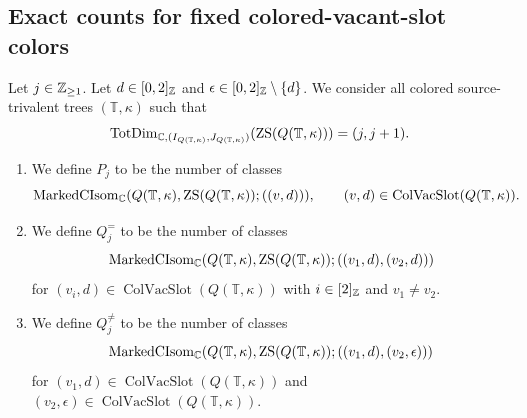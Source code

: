 \subsection{Exact counts for fixed colored-vacant-slot colors}
\begin{definition}\label{def:marked-block-counts}
Let $j\in\mathbb Z_{\ge1}$. Let $d\in[0,2]_{\mathbb Z}$ and $\epsilon\in[0,2]_{\mathbb Z}\setminus\{d\}$.
We consider all colored source-trivalent trees $(\mathbb T,\kappa)$ such that
\[
 \operatorname{TotDim}_{\mathbb C,(I_{Q(\mathbb T,\kappa)},J_{Q(\mathbb T,\kappa)})}(\operatorname{ZS}(Q(\mathbb T,\kappa)))=(j,j+1).
\]
\begin{enumerate}[font=\itshape]
\item We define $P_j$ to be the number of classes
\[
 \operatorname{MarkedCIsom}_{\mathbb C}(Q(\mathbb T,\kappa),\operatorname{ZS}(Q(\mathbb T,\kappa));((v,d))),
 \qquad (v,d)\in\operatorname{ColVacSlot}(Q(\mathbb T,\kappa)).
\]
\item We define $Q_j^{=}$ to be the number of classes
\[
 \operatorname{MarkedCIsom}_{\mathbb C}(Q(\mathbb T,\kappa),\operatorname{ZS}(Q(\mathbb T,\kappa));((v_1,d),(v_2,d)))
\]
for $(v_i,d)\in\operatorname{ColVacSlot}(Q(\mathbb T,\kappa))$ with $i\in[2]_{\mathbb Z}$ and $v_1\ne v_2$.
\item We define $Q_j^{\ne}$ to be the number of classes
\[
 \operatorname{MarkedCIsom}_{\mathbb C}(Q(\mathbb T,\kappa),\operatorname{ZS}(Q(\mathbb T,\kappa));((v_1,d),(v_2,\epsilon)))
\]
for $(v_1,d)\in\operatorname{ColVacSlot}(Q(\mathbb T,\kappa))$ and $(v_2,\epsilon)\in\operatorname{ColVacSlot}(Q(\mathbb T,\kappa))$.
\end{enumerate}
\end{definition}
